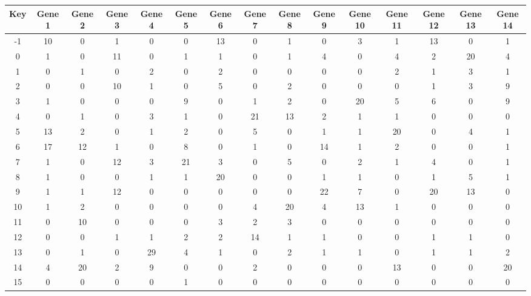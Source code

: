 \begin{tabular}{|c|c|c|c|c|c|c|c|c|c|c|c|c|c|c|}
\hline
Key & Gene 1 & Gene 2 & Gene 3 & Gene 4 & Gene 5 & Gene 6 & Gene 7 & Gene 8 & Gene 9 & Gene 10 & Gene 11 & Gene 12 & Gene 13 & Gene 14 \\
\hline
-1 & 10 & 0 & 1 & 0 & 0 & 13 & 0 & 1 & 0 & 3 & 1 & 13 & 0 & 1 \\
0 & 1 & 0 & 11 & 0 & 1 & 1 & 0 & 1 & 4 & 0 & 4 & 2 & 20 & 4 \\
1 & 0 & 1 & 0 & 2 & 0 & 2 & 0 & 0 & 0 & 0 & 2 & 1 & 3 & 1 \\
2 & 0 & 0 & 10 & 1 & 0 & 5 & 0 & 2 & 0 & 0 & 0 & 1 & 3 & 9 \\
3 & 1 & 0 & 0 & 0 & 9 & 0 & 1 & 2 & 0 & 20 & 5 & 6 & 0 & 9 \\
4 & 0 & 1 & 0 & 3 & 1 & 0 & 21 & 13 & 2 & 1 & 1 & 0 & 0 & 0 \\
5 & 13 & 2 & 0 & 1 & 2 & 0 & 5 & 0 & 1 & 1 & 20 & 0 & 4 & 1 \\
6 & 17 & 12 & 1 & 0 & 8 & 0 & 1 & 0 & 14 & 1 & 2 & 0 & 0 & 1 \\
7 & 1 & 0 & 12 & 3 & 21 & 3 & 0 & 5 & 0 & 2 & 1 & 4 & 0 & 1 \\
8 & 1 & 0 & 0 & 1 & 1 & 20 & 0 & 0 & 1 & 1 & 0 & 1 & 5 & 1 \\
9 & 1 & 1 & 12 & 0 & 0 & 0 & 0 & 0 & 22 & 7 & 0 & 20 & 13 & 0 \\
10 & 1 & 2 & 0 & 0 & 0 & 0 & 4 & 20 & 4 & 13 & 1 & 0 & 0 & 0 \\
11 & 0 & 10 & 0 & 0 & 0 & 3 & 2 & 3 & 0 & 0 & 0 & 0 & 0 & 0 \\
12 & 0 & 0 & 1 & 1 & 2 & 2 & 14 & 1 & 1 & 0 & 0 & 1 & 1 & 0 \\
13 & 0 & 1 & 0 & 29 & 4 & 1 & 0 & 2 & 1 & 1 & 0 & 1 & 1 & 2 \\
14 & 4 & 20 & 2 & 9 & 0 & 0 & 2 & 0 & 0 & 0 & 13 & 0 & 0 & 20 \\
15 & 0 & 0 & 0 & 0 & 1 & 0 & 0 & 0 & 0 & 0 & 0 & 0 & 0 & 0 \\
\hline
\end{tabular}
